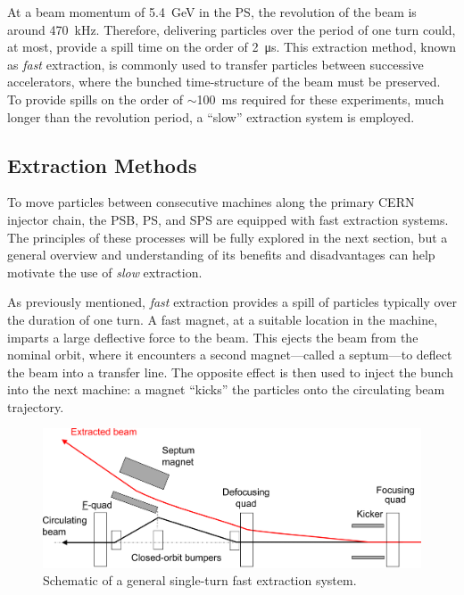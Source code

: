 \documentclass[11pt]{report}
\begin{document}
At a beam momentum of \qty{5.4}{\giga\electronvolt} in the PS, the revolution of the beam is around \qty{470}{kHz}. Therefore, delivering particles over the period of one turn could, at most, provide a spill time on the order of \qty{2}{\micro\second}. This extraction method, known as \textit{fast} extraction, is commonly used to transfer particles between successive accelerators, where the bunched time-structure of the beam must be preserved. To provide spills on the order of $\sim$\qty{100}{\ms} required for these experiments, much longer than the revolution period, a ``slow'' extraction system is employed.

\subsection{Extraction Methods}

To move particles between consecutive machines along the primary CERN injector chain, the PSB, PS, and SPS are equipped with fast extraction systems. The principles of these processes will be fully explored in the next section, but a general overview and understanding of its benefits and disadvantages can help motivate the use of \textit{slow} extraction. 

As previously mentioned, \textit{fast} extraction provides a spill of particles typically over the duration of one turn. A fast magnet, at a suitable location in the machine, imparts a large deflective force to the beam. This ejects the beam from the nominal orbit, where it encounters a second magnet---called a septum---to deflect the beam into a transfer line. The opposite effect is then used to inject the bunch into the next machine: a magnet ``kicks'' the particles onto the circulating beam trajectory.

\begin{figure}[h]
  \centering
  \includegraphics[width=\linewidth]{fast.png}
  \caption{Schematic of a general single-turn fast extraction system.~\cite{Fraser:CAS}}
  \label{fig:fast_diagram}
\end{figure}
\end{document}
